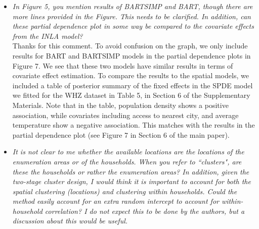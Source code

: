 \documentclass[12pt]{article}
\begin{document}
\begin{enumerate}
\begin{itemize}
    {\color{darkblue} We have also re-generated the partial dependence graphs, under more posterior samples (2000 samples after a burn-in period of 2000), under the original covariate scales. The regenerated figure is shown in Figure 7. Note that due to the log-transformation we applied to a few of the covariates, the partial dependence plots on some of the covariates are gridded unevenly. We also included an alternative version of the partial dependence plots in Figure 12, Supplementary Materials Section 5, with $x$ on the transformed scale.
    }\\

    \item {\it In Figure 5, you mention results of BARTSIMP and BART, though there are more lines provided in the Figure. This needs to be clarified. In addition, can these partial dependence plot in some way be compared to the covariate effects from the INLA model?}\\

    {\color{darkblue} Thanks for  this comment. To avoid confusion on the graph, we only include results for BART and BARTSIMP models in the partial dependence plots in Figure 7. We see that these two models have similar results in terms of covariate effect estimation. To compare the results to the spatial models, we included a table of posterior summary of the fixed effects in the SPDE model we fitted for the WHZ dataset in Table 5, in Section 6 of the Supplementary Materials. Note that in the table, population density shows a positive association, while covariates including access to nearest city, and average temperature show a negative association. This matches with the results in the partial dependence plot (see Figure 7 in Section 6 of the main paper). 
    }\\
    
    \item {\it It is not clear to me whether the available locations are the locations of the enumeration areas or of the households. When you refer to ``clusters", are these the households or rather the enumeration areas? In addition, given the two-stage cluster design, I would think it is important to account for both the spatial clustering (locations) and clustering within households. Could the method easily account for an extra random intercept to account for within-household correlation? I do not expect this to be done by the authors, but a discussion about this would be useful.}\\


\end{itemize}
\end{enumerate}
\end{document}
